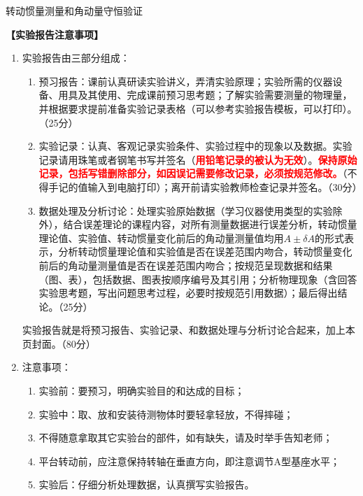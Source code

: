 \documentclass[dvipsnames, svgnames,a4paper,11pt]{article}
\begin{document}

\infoTable{}{}{}{}{}{} %

\begin{center}
	\LARGE 转动惯量测量和角动量守恒验证
\end{center}

\textbf{【实验报告注意事项】}
\begin{enumerate}
	\item 实验报告由三部分组成：
	\begin{enumerate}
		\item 预习报告：课前认真研读实验讲义，弄清实验原理；实验所需的仪器设备、用具及其使用、完成课前预习思考题；了解实验需要测量的物理量，并根据要求提前准备实验记录表格（可以参考实验报告模板，可以打印）。（25分）
	    \item 实验记录：认真、客观记录实验条件、实验过程中的现象以及数据。实验记录请用珠笔或者钢笔书写并签名（\textcolor{red}{\textbf{用铅笔记录的被认为无效}}）。\textcolor{red}{\textbf{保持原始记录，包括写错删除部分，如因误记需要修改记录，必须按规范修改。}}（不得手记的值输入到电脑打印）；离开前请实验教师检查记录并签名。（30分）
	    \item 数据处理及分析讨论：处理实验原始数据（学习仪器使用类型的实验除外），结合误差理论的课程内容，对所有测量数据进行误差分析，转动惯量理论值、实验值、转动惯量变化前后的角动量测量值均用$A\pm\delta A$的形式表示，分析转动惯量理论值和实验值是否在误差范围内吻合，转动惯量变化前后的角动量测量值是否在误差范围内吻合；按规范呈现数据和结果（图、表），包括数据、图表按顺序编号及其引用；分析物理现象（含回答实验思考题，写出问题思考过程，必要时按规范引用数据）；最后得出结论。（25分）
	\end{enumerate}
	实验报告就是将预习报告、实验记录、和数据处理与分析讨论合起来，加上本页封面。（80分）
	\item 注意事项：
	\begin{enumerate}
		\item 实验前：要预习，明确实验目的和达成的目标；
		\item 实验中：取、放和安装待测物体时要轻拿轻放，不得摔碰；
		\item 不得随意拿取其它实验台的部件，如有缺失，请及时举手告知老师；
		\item 平台转动前，应注意保持转轴在垂直方向，即注意调节A型基座水平；
		\item 实验后：仔细分析处理数据，认真撰写实验报告。
	\end{enumerate}
\end{enumerate}
\end{document}
